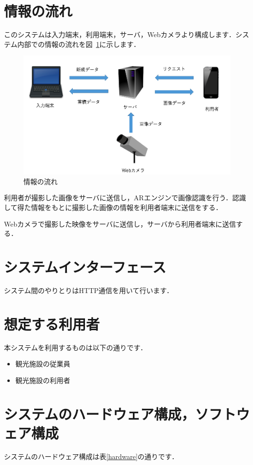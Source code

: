 \documentclass[a4j]{jarticle}
\begin{document}
\section{情報の流れ}
このシステムは入力端末，利用端末，サーバ，Webカメラより構成します．システム内部での情報の流れを図~\ref{data_nagare}に示します．

\begin{figure}[H]
	\begin{center}
		\includegraphics[width=0.8 \linewidth]{data_nagare.png}
		\caption{情報の流れ}
		\label{data_nagare}
	\end{center}
\end{figure}

利用者が撮影した画像をサーバに送信し，ARエンジンで画像認識を行う．認識して得た情報をもとに撮影した画像の情報を利用者端末に送信をする．

Webカメラで撮影した映像をサーバに送信し，サーバから利用者端末に送信する．

\section{システムインターフェース}
システム間のやりとりはHTTP通信を用いて行います．

\section{想定する利用者}
本システムを利用するものは以下の通りです．
\begin{itemize}
	\item 観光施設の従業員
	\item 観光施設の利用者
\end{itemize}

\section{システムのハードウェア構成，ソフトウェア構成}
システムのハードウェア構成は表\ref{hardware}の通りです．
\end{document}
